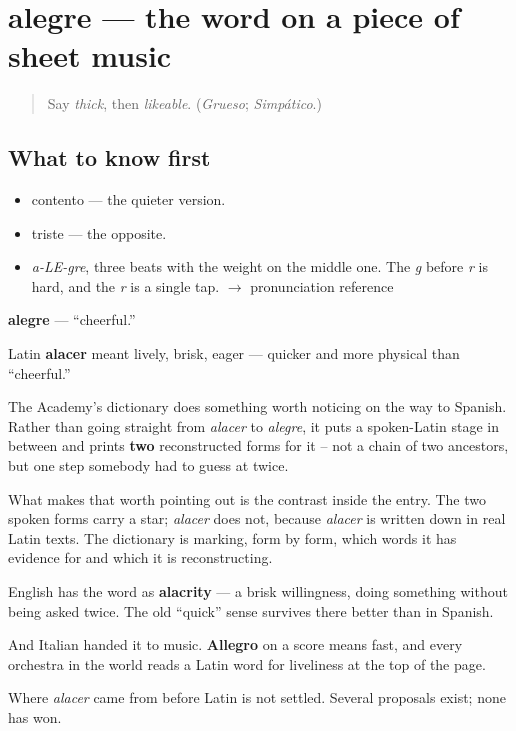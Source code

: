 \section[alegre]{alegre — the word on a piece of sheet music}

\label{lesson:ES-C380-alegre}



\begin{quote}
Say \emph{thick}, then \emph{likeable}. (\emph{Grueso}; \emph{Simpático}.)
\end{quote}

\subsection*{What to know first}
\begin{itemize}
\raggedright
  \item contento — the quieter version.
  \item triste — the opposite.
\end{itemize}

\begin{sounds}
\begin{itemize}
\raggedright
  \item \emph{a-LE-gre}, three beats with the weight on the middle one. The \emph{g} before \emph{r} is hard, and the \emph{r} is a single tap. $\to$ pronunciation reference
\end{itemize}
\end{sounds}

\begin{cousinweb}
\textbf{alegre} — \textquotedblleft{}cheerful.\textquotedblright{}

Latin \textbf{alacer} meant lively, brisk, eager — quicker and more physical than \textquotedblleft{}cheerful.\textquotedblright{}

The Academy's dictionary does something worth noticing on the way to Spanish. Rather than going straight from \emph{alacer} to \emph{alegre}, it puts a spoken-Latin stage in between and prints \textbf{two} reconstructed forms for it -- not a chain of two ancestors, but one step somebody had to guess at twice.

What makes that worth pointing out is the contrast inside the entry. The two spoken forms carry a star; \emph{alacer} does not, because \emph{alacer} is written down in real Latin texts. The dictionary is marking, form by form, which words it has evidence for and which it is reconstructing.

English has the word as \textbf{alacrity} — a brisk willingness, doing something without being asked twice. The old \textquotedblleft{}quick\textquotedblright{} sense survives there better than in Spanish.

And Italian handed it to music. \textbf{Allegro} on a score means fast, and every orchestra in the world reads a Latin word for liveliness at the top of the page.

Where \emph{alacer} came from before Latin is not settled. Several proposals exist; none has won.
\end{cousinweb}

